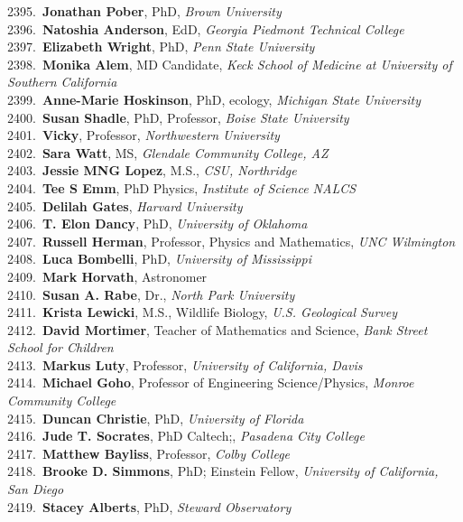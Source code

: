 2395.~{\bf Jonathan Pober}, PhD, {\sl Brown University} \\
2396.~{\bf Natoshia Anderson}, EdD, {\sl Georgia Piedmont Technical College} \\
2397.~{\bf Elizabeth Wright}, PhD, {\sl Penn State University} \\
2398.~{\bf Monika Alem}, MD Candidate, {\sl Keck School of Medicine at University of Southern California} \\
2399.~{\bf Anne-Marie Hoskinson}, PhD, ecology, {\sl Michigan State University} \\
2400.~{\bf Susan Shadle}, PhD, Professor, {\sl Boise State University} \\
2401.~{\bf Vicky}, Professor, {\sl Northwestern University} \\
2402.~{\bf Sara Watt}, MS, {\sl Glendale Community College, AZ} \\
2403.~{\bf Jessie MNG Lopez}, M.S., {\sl CSU, Northridge} \\
2404.~{\bf Tee S Emm}, PhD Physics, {\sl Institute of Science NALCS} \\
2405.~{\bf Delilah Gates}, {\sl Harvard University} \\
2406.~{\bf T. Elon Dancy}, PhD, {\sl University of Oklahoma} \\
2407.~{\bf Russell Herman}, Professor, Physics and Mathematics, {\sl UNC Wilmington} \\
2408.~{\bf Luca Bombelli}, PhD, {\sl University of Mississippi} \\
2409.~{\bf Mark Horvath}, Astronomer \\
2410.~{\bf Susan A. Rabe}, Dr., {\sl North Park University} \\
2411.~{\bf Krista Lewicki}, M.S., Wildlife Biology, {\sl U.S. Geological Survey } \\
2412.~{\bf David Mortimer}, Teacher of Mathematics and Science, {\sl Bank Street School for Children} \\
2413.~{\bf Markus Luty}, Professor, {\sl University of California, Davis} \\
2414.~{\bf Michael Goho}, Professor of Engineering Science/Physics, {\sl Monroe Community College} \\
2415.~{\bf Duncan Christie}, PhD, {\sl University of Florida} \\
2416.~{\bf Jude T. Socrates}, PhD Caltech;, {\sl  Pasadena City College} \\
2417.~{\bf Matthew Bayliss}, Professor, {\sl Colby College} \\
2418.~{\bf Brooke D. Simmons}, PhD; Einstein Fellow, {\sl University of California, San Diego} \\
2419.~{\bf Stacey Alberts}, PhD, {\sl Steward Observatory} \\
